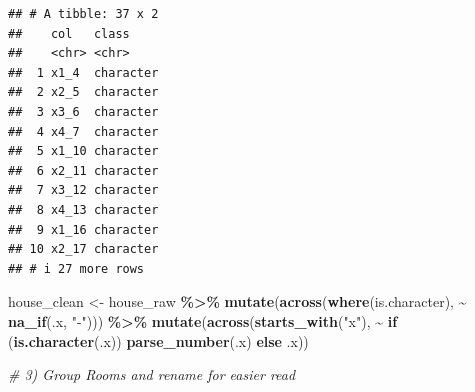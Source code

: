 \documentclass[
]{article}
\newenvironment{Shaded}{\begin{snugshade}}{\end{snugshade}}
\newcommand{\CommentTok}[1]{\textcolor[rgb]{0.56,0.35,0.01}{\textit{#1}}}
\newcommand{\ControlFlowTok}[1]{\textcolor[rgb]{0.13,0.29,0.53}{\textbf{#1}}}
\newcommand{\FunctionTok}[1]{\textcolor[rgb]{0.13,0.29,0.53}{\textbf{#1}}}
\newcommand{\NormalTok}[1]{#1}
\newcommand{\OtherTok}[1]{\textcolor[rgb]{0.56,0.35,0.01}{#1}}
\newcommand{\SpecialCharTok}[1]{\textcolor[rgb]{0.81,0.36,0.00}{\textbf{#1}}}
\newcommand{\StringTok}[1]{\textcolor[rgb]{0.31,0.60,0.02}{#1}}
\begin{document}
\begin{verbatim}
## # A tibble: 37 x 2
##    col   class    
##    <chr> <chr>    
##  1 x1_4  character
##  2 x2_5  character
##  3 x3_6  character
##  4 x4_7  character
##  5 x1_10 character
##  6 x2_11 character
##  7 x3_12 character
##  8 x4_13 character
##  9 x1_16 character
## 10 x2_17 character
## # i 27 more rows
\end{verbatim}

\begin{Shaded}
\begin{Highlighting}[]
\NormalTok{house\_clean }\OtherTok{\textless{}{-}}\NormalTok{ house\_raw }\SpecialCharTok{\%\textgreater{}\%}
  \FunctionTok{mutate}\NormalTok{(}\FunctionTok{across}\NormalTok{(}\FunctionTok{where}\NormalTok{(is.character), }\SpecialCharTok{\textasciitilde{}} \FunctionTok{na\_if}\NormalTok{(.x, }\StringTok{"{-}"}\NormalTok{))) }\SpecialCharTok{\%\textgreater{}\%}
  \FunctionTok{mutate}\NormalTok{(}\FunctionTok{across}\NormalTok{(}\FunctionTok{starts\_with}\NormalTok{(}\StringTok{"x"}\NormalTok{), }
                \SpecialCharTok{\textasciitilde{}} \ControlFlowTok{if}\NormalTok{ (}\FunctionTok{is.character}\NormalTok{(.x)) }\FunctionTok{parse\_number}\NormalTok{(.x) }\ControlFlowTok{else}\NormalTok{ .x))}

\CommentTok{\# 3) Group Rooms and rename for easier read}


\end{Highlighting}
\end{Shaded}
\end{document}
